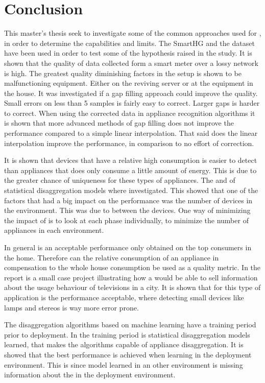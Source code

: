 \chapter{Conclusion}
This master's thesis seek to investigate some of the common approaches used for , in order to determine the capabilities and limits. The SmartHG and the  dataset have been used in order to test some of the hypothesis raised in the study. It is shown that the quality of data collected form a smart meter over a lossy network is high. The greatest quality diminishing factors in the setup is shown to be malfunctioning equipment. Either on the reviving server or at the equipment in the house. It was investigated if a gap filling approach could improve the quality. Small errors on less than 5 samples is fairly easy to correct. Larger gaps is harder to correct. When using the corrected data in appliance recognition algorithms it is shown that more advanced methods of gap filling does not improve the performance compared to a simple linear interpolation. That said does the linear interpolation improve the performance, in comparison to no effort of correction. 

It is shown that devices that have a relative high consumption is easier to detect than appliances that does only consume a little amount of energy. This is due to the greater chance of uniqueness for these types of appliances. The  and  of statistical disaggregation models where investigated. This showed that one of the factors that had a big impact on the performance was the number of devices in the environment. This was due to  between the devices. One way of minimizing the impact of  is to look at each phase individually, to minimize the number of appliances in each environment. 

In general is an acceptable performance only obtained on the top consumers in the home. Therefore can the relative consumption of an appliance in compensation to the whole house consumption be used as a quality metric. In the report is a small case project illustrating how a  would be able to sell information about the usage behaviour of televisions in a city. It is shown that for this type of application is the performance acceptable, where detecting small devices like lamps and stereos is way more error prone. 

The  disaggregation algorithms based on machine learning have a training period prior to deployment. In the training period is statistical disaggregation models learned, that makes the algorithms capable of appliance disaggregation. It is showed that the best performance is achieved when learning in the deployment environment. This is since model learned in an other environment is missing information about the  in the deployment environment. 

